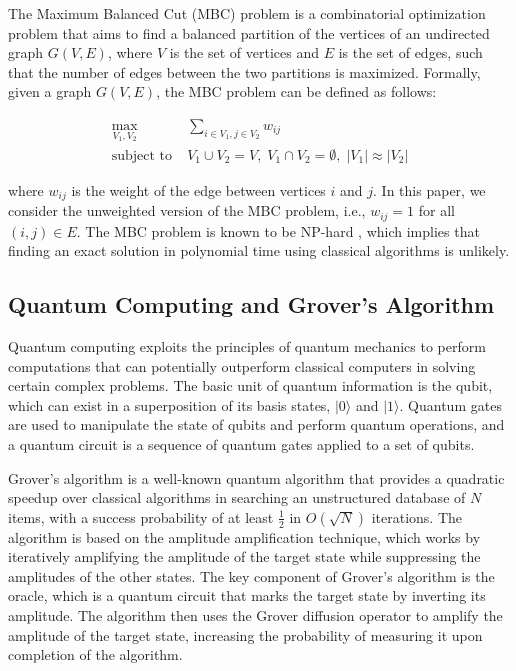 The Maximum Balanced Cut (MBC) problem is a combinatorial optimization problem that aims to find a balanced partition of the vertices of an undirected graph $G(V, E)$, where $V$ is the set of vertices and $E$ is the set of edges, such that the number of edges between the two partitions is maximized. Formally, given a graph $G(V, E)$, the MBC problem can be defined as follows:

\begin{align}
    \max_{V_1, V_2} \; &\sum_{i \in V_1, j \in V_2} w_{ij} \\
    \text{subject to} \; &V_1 \cup V_2 = V, \; V_1 \cap V_2 = \emptyset, \; |V_1| \approx |V_2|
\end{align}

where $w_{ij}$ is the weight of the edge between vertices $i$ and $j$. In this paper, we consider the unweighted version of the MBC problem, i.e., $w_{ij} = 1$ for all $(i, j) \in E$. The MBC problem is known to be NP-hard \cite{3}, which implies that finding an exact solution in polynomial time using classical algorithms is unlikely.

\subsection{Quantum Computing and Grover's Algorithm}

Quantum computing exploits the principles of quantum mechanics to perform computations that can potentially outperform classical computers in solving certain complex problems. The basic unit of quantum information is the qubit, which can exist in a superposition of its basis states, $|0\rangle$ and $|1\rangle$. Quantum gates are used to manipulate the state of qubits and perform quantum operations, and a quantum circuit is a sequence of quantum gates applied to a set of qubits.

Grover's algorithm \cite{5} is a well-known quantum algorithm that provides a quadratic speedup over classical algorithms in searching an unstructured database of $N$ items, with a success probability of at least $\frac{1}{2}$ in $O(\sqrt{N})$ iterations. The algorithm is based on the amplitude amplification technique, which works by iteratively amplifying the amplitude of the target state while suppressing the amplitudes of the other states. The key component of Grover's algorithm is the oracle, which is a quantum circuit that marks the target state by inverting its amplitude. The algorithm then uses the Grover diffusion operator to amplify the amplitude of the target state, increasing the probability of measuring it upon completion of the algorithm.

